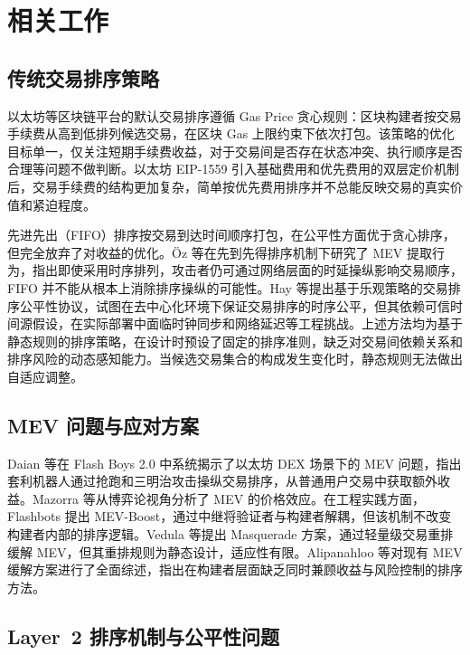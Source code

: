 
\section{相关工作}

\subsection{传统交易排序策略}

以太坊等区块链平台的默认交易排序遵循 Gas Price 贪心规则：区块构建者按交易手续费从高到低排列候选交易，在区块 Gas 上限约束下依次打包\cite{ethereum2024pbs}。该策略的优化目标单一，仅关注短期手续费收益，对于交易间是否存在状态冲突、执行顺序是否合理等问题不做判断。以太坊 EIP-1559 引入基础费用和优先费用的双层定价机制后，交易手续费的结构更加复杂，简单按优先费用排序并不总能反映交易的真实价值和紧迫程度。

先进先出（FIFO）排序按交易到达时间顺序打包，在公平性方面优于贪心排序，但完全放弃了对收益的优化。\"Oz 等\cite{oz2024fcfs}在先到先得排序机制下研究了 MEV 提取行为，指出即使采用时序排列，攻击者仍可通过网络层面的时延操纵影响交易顺序，FIFO 并不能从根本上消除排序操纵的可能性。Hay 等\cite{hay2025fairness}提出基于乐观策略的交易排序公平性协议，试图在去中心化环境下保证交易排序的时序公平，但其依赖可信时间源假设，在实际部署中面临时钟同步和网络延迟等工程挑战。上述方法均为基于静态规则的排序策略，在设计时预设了固定的排序准则，缺乏对交易间依赖关系和排序风险的动态感知能力。当候选交易集合的构成发生变化时，静态规则无法做出自适应调整。

\subsection{MEV 问题与应对方案}

Daian 等\cite{daian2019flash}在 Flash Boys 2.0 中系统揭示了以太坊 DEX 场景下的 MEV 问题，指出套利机器人通过抢跑和三明治攻击操纵交易排序，从普通用户交易中获取额外收益。Mazorra 等\cite{mazorra2022price}从博弈论视角分析了 MEV 的价格效应。在工程实践方面，Flashbots 提出 MEV-Boost\cite{flashbots2022mevboost}，通过中继将验证者与构建者解耦，但该机制不改变构建者内部的排序逻辑。Vedula 等\cite{vedula2023masquerade}提出 Masquerade 方案，通过轻量级交易重排缓解 MEV，但其重排规则为静态设计，适应性有限。Alipanahloo 等\cite{alipanahloo2024mev}对现有 MEV 缓解方案进行了全面综述，指出在构建者层面缺乏同时兼顾收益与风险控制的排序方法。

\subsection{Layer~2 排序机制与公平性问题}

